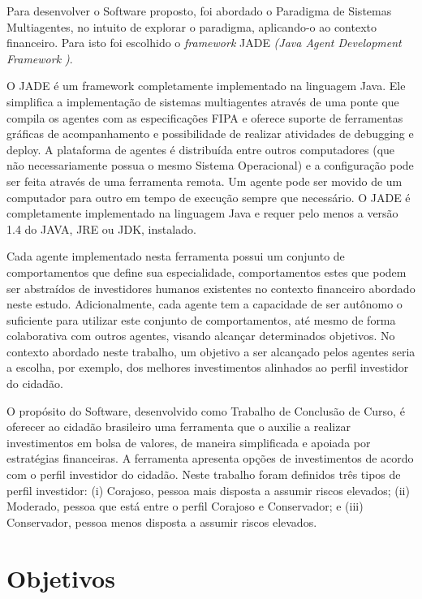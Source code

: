 Para desenvolver o Software proposto, foi abordado o Paradigma de Sistemas Multiagentes, no intuito de explorar o paradigma, aplicando-o ao contexto financeiro. Para isto foi escolhido o \textit{framework} JADE  \textit{(Java Agent Development Framework )}.

\begin{citacao}
O JADE é um framework completamente implementado na linguagem Java. Ele simplifica a implementação de sistemas multiagentes através de uma ponte que compila os agentes com as especificações FIPA e oferece suporte de ferramentas gráficas de acompanhamento e possibilidade de realizar atividades de debugging e deploy.  A plataforma de agentes é distribuída entre outros computadores (que não necessariamente possua o mesmo Sistema Operacional) e a configuração pode ser feita através de uma ferramenta remota. Um agente pode ser movido de um computador para outro em tempo de execução sempre que necessário. O JADE é completamente implementado na linguagem Java e requer pelo menos a versão 1.4 do JAVA, JRE ou  JDK, instalado. \cite{telecon2014}
\end{citacao}

Cada agente implementado nesta ferramenta possui um conjunto de comportamentos que define sua especialidade, comportamentos estes que podem ser abstraídos de investidores humanos existentes no contexto financeiro abordado neste estudo. Adicionalmente, cada agente tem a capacidade de ser autônomo o suficiente para utilizar este conjunto de comportamentos, até mesmo de forma colaborativa com outros agentes, visando alcançar determinados objetivos. No contexto abordado neste trabalho, um objetivo a ser alcançado pelos agentes seria a escolha, por exemplo, dos melhores investimentos alinhados ao perfil investidor do cidadão.

O propósito do Software, desenvolvido como Trabalho de Conclusão de Curso, é oferecer ao cidadão brasileiro uma ferramenta que o auxilie a realizar investimentos em bolsa de valores, de maneira simplificada e apoiada por estratégias financeiras. A ferramenta apresenta opções de investimentos de acordo com o perfil investidor do cidadão. Neste trabalho foram definidos três tipos de perfil investidor: (i) Corajoso, pessoa mais disposta a assumir riscos elevados; (ii) Moderado, pessoa que está entre o perfil Corajoso e Conservador; e (iii) Conservador, pessoa menos disposta a assumir riscos elevados.


\section{Objetivos}

